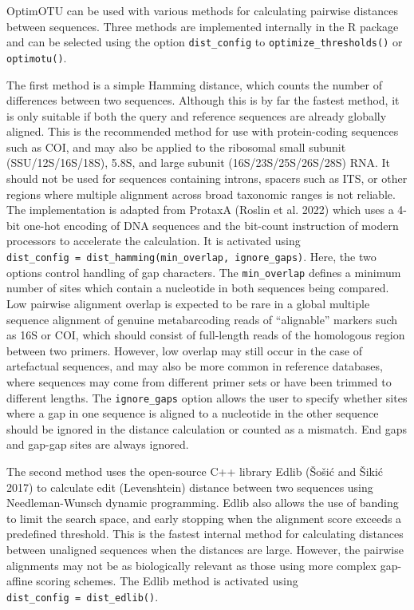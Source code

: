 \documentclass[
]{article}
\begin{document}
OptimOTU can be used with various methods for calculating pairwise distances between sequences.
Three methods are implemented internally in the R package and can be selected using the option \texttt{dist\_config} to \texttt{optimize\_thresholds()} or \texttt{optimotu()}.

The first method is a simple Hamming distance, which counts the number of differences between two sequences.
Although this is by far the fastest method, it is only suitable if both the query and reference sequences are already globally aligned.
This is the recommended method for use with protein-coding sequences such as COI, and may also be applied to the ribosomal small subunit (SSU/12S/16S/18S), 5.8S, and large subunit (16S/23S/25S/26S/28S) RNA.
It should not be used for sequences containing introns, spacers such as ITS, or other regions where multiple alignment across broad taxonomic ranges is not reliable.
The implementation is adapted from ProtaxA (Roslin et al. 2022) which uses a 4-bit one-hot encoding of DNA sequences and the bit-count instruction of modern processors to accelerate the calculation.
It is activated using \texttt{dist\_config\ =\ dist\_hamming(min\_overlap,\ ignore\_gaps)}.
Here, the two options control handling of gap characters.
The \texttt{min\_overlap} defines a minimum number of sites which contain a nucleotide in both sequences being compared.
Low pairwise alignment overlap is expected to be rare in a global multiple sequence alignment of genuine metabarcoding reads of ``alignable'' markers such as 16S or COI, which should consist of full-length reads of the homologous region between two primers.
However, low overlap may still occur in the case of artefactual sequences, and may also be more common in reference databases, where sequences may come from different primer sets or have been trimmed to different lengths.
The \texttt{ignore\_gaps} option allows the user to specify whether sites where a gap in one sequence is aligned to a nucleotide in the other sequence should be ignored in the distance calculation or counted as a mismatch.
End gaps and gap-gap sites are always ignored.

The second method uses the open-source C++ library Edlib (Šošić and Šikić 2017) to calculate edit (Levenshtein) distance between two sequences using Needleman-Wunsch dynamic programming.
Edlib also allows the use of banding to limit the search space, and early stopping when the alignment score exceeds a predefined threshold.
This is the fastest internal method for calculating distances between unaligned sequences when the distances are large.
However, the pairwise alignments may not be as biologically relevant as those using more complex gap-affine scoring schemes.
The Edlib method is activated using \texttt{dist\_config\ =\ dist\_edlib()}.
\end{document}
